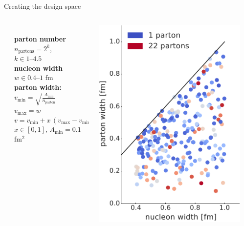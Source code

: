 \documentclass[aspectratio=43]{beamer}
\theoremstyle{definition}
\begin{document}
\begin{frame}{Creating the design space}
  \begin{columns}
    \begin{column}{.05\textwidth}
    \end{column}
    \begin{column}{.45\textwidth}
      \smallskip \\
      \textbf{parton number} \\[1ex]
      $n_\mathrm{partons} = 2^k$, \\[1ex]
      $k \in 1$--$4.5$ \\[1ex]
      \textbf{nucleon width} \\[1ex]
      $w \in 0.4$--$1$ fm \\[1ex]
      \textbf{parton width:} \\[1ex]
      $v_\mathrm{min} = \sqrt{\frac{A_\mathrm{min}}{n_\mathrm{parton}}}$ \\[1ex]
      $v_\mathrm{max} = w$ \\[1ex]
      $v = v_\mathrm{min} + x\,(v_\mathrm{max} - v_\mathrm{min})$ \\[1ex]
      $x \in [0, 1]$, \quad $A_\mathrm{min} = 0.1$ fm$^2$
    \end{column}
    \begin{column}{.45\textwidth}
      \includegraphics{parameter_design}
    \end{column}
    \begin{column}{.05\textwidth}
    \end{column}
  \end{columns}
\end{frame}
\end{document}
